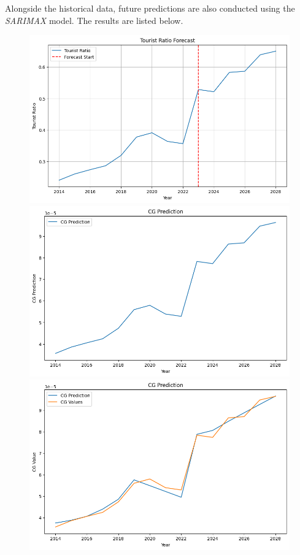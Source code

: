 Alongside the historical data, future predictions are also conducted using the \textit{SARIMAX} model.
The results are listed below.

\begin{figure}[H]
    \centering
    \begin{minipage}{0.32\textwidth}
        \centering
        \includegraphics[width=\textwidth]{Ratio.png}
    \end{minipage}
    \begin{minipage}{0.32\textwidth}
        \centering
        \includegraphics[width=\textwidth]{CG_pred.png}
    \end{minipage}
    \begin{minipage}{0.32\textwidth}
        \centering
        \includegraphics[width=\textwidth]{CG_pred2.png}

\end{minipage}
\end{figure}
